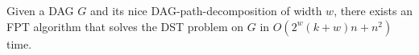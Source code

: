 \documentclass[runningheads]{llncs}
\theoremstyle{plain}
\theoremstyle{definition}
\begin{document}
\begin{theorem}
    Given a DAG \(G\) and its nice DAG-path-decomposition of width \(w\), there exists an FPT algorithm that solves the DST problem on \(G\) in \(O(2^w (k+w) n + n^2)\) time.  
\end{theorem}







\begin{comment}
    

\subsection{木分解と比較したときのDAGパス分解の利点}

DAG上のNP困難な問題に対し，基礎グラフの木幅を用いてパラメータ化アルゴリズムを構築できる場合がある．しかし木分解は枝の向きの情報をもたないため，アルゴリズムの構築が複雑になることがある．一方，DAGパス分解は枝の向きの情報をもつため，一般に木分解を利用するよりもアルゴリズムの構築が容易になる場合が多い．本節では\textsc{Directed Edge Dominating Set Problem(DEDS problem)}に対する木分解を用いたアルゴリズム~\cite{art22}と，DAGパス分解を用いたアルゴリズムとの比較を行い，DAGパス分解の特長を示す．有向グラフ$G=(V, E)$に対し，$S \subseteq E$が$G$の\emph{Directed Edge Dominating Set\ (DEDS)}であるとは，任意の$(v, w) \in E$に対し，$(v, w) \in S$であるか，もしくはある$(u, v) \in S$が存在することの少なくとも一方が成り立つことである．\emph{minimum DEDS\ (mDEDS)}とは，全てのDEDS $S$のうち$|S|$が最小のものである．DEDS problemとは，$G$のmDEDSのサイズを求める問題である．似た問題として\emph{Directed Dominating Set problem\ (DiDS problem)}がある．これは任意の$v \in V$に対し，$v \in S$か，ある$u \in S ~((u, v) \in E)$が存在するかのいずれかを満たす$S\subseteq V$のうちサイズが最小の$S$を求める問題である．Hanakaら~\cite{art23}は以下を示した．

\begin{proposition}[計算量クラス]
    DEDS problemは出次数が制限された平面的DAGの場合でもNP困難である．
\end{proposition}

さらに~\cite{art22}では木幅を用いたFPTアルゴリズムが提案された．

\begin{proposition}
    DAG $G$の基礎グラフの木幅が高々$tw$であるとき，$G$のDEDS problemを$4^{2tw^2}8^{2tw}n^{O(1)}$の時間で解くFPTアルゴリズムが存在する．
\end{proposition}


\end{comment}
\end{document}
